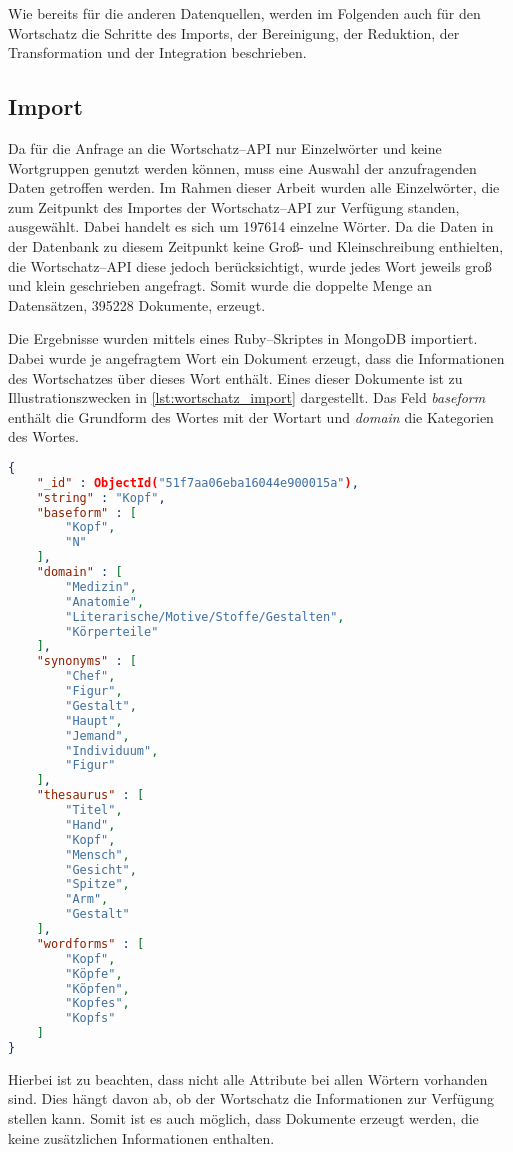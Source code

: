 Wie bereits für die anderen Datenquellen, werden im Folgenden auch für den Wortschatz die Schritte des Imports, der Bereinigung, der Reduktion, der Transformation und der Integration beschrieben.

\subsection{Import}

Da für die Anfrage an die Wortschatz--API nur Einzelwörter und keine Wortgruppen genutzt werden können, muss eine Auswahl der anzufragenden Daten getroffen werden. Im Rahmen dieser Arbeit wurden alle Einzelwörter, die zum Zeitpunkt des Importes der Wortschatz--API zur Verfügung standen, ausgewählt. Dabei handelt es sich um \num{197614} einzelne Wörter. Da die Daten in der Datenbank zu diesem Zeitpunkt keine Groß- und Kleinschreibung enthielten, die Wortschatz--API diese jedoch berücksichtigt, wurde jedes Wort jeweils groß und klein geschrieben angefragt. Somit wurde die doppelte Menge an Datensätzen, \num{395228} Dokumente, erzeugt.

Die Ergebnisse wurden mittels eines Ruby--Skriptes in MongoDB importiert. Dabei wurde je angefragtem Wort ein Dokument erzeugt, dass die Informationen des Wortschatzes über dieses Wort enthält. Eines dieser Dokumente ist zu Illustrationszwecken in \cref{lst:wortschatz_import} dargestellt. Das Feld \emph{baseform} enthält die Grundform des Wortes mit der Wortart und \emph{domain} die Kategorien des Wortes.

\begin{lstlisting}[language=json, label={lst:wortschatz_import}, caption={Wortschatz--Dokument nach dem Import}]
{
    "_id" : ObjectId("51f7aa06eba16044e900015a"),
    "string" : "Kopf",
    "baseform" : [ 
        "Kopf", 
        "N"
    ],
    "domain" : [ 
        "Medizin", 
        "Anatomie", 
        "Literarische/Motive/Stoffe/Gestalten", 
        "Körperteile"
    ],
    "synonyms" : [  
        "Chef", 
        "Figur", 
        "Gestalt", 
        "Haupt", 
        "Jemand", 
        "Individuum", 
        "Figur"
    ],
    "thesaurus" : [ 
        "Titel", 
        "Hand", 
        "Kopf", 
        "Mensch", 
        "Gesicht", 
        "Spitze", 
        "Arm", 
        "Gestalt"
    ],
    "wordforms" : [ 
        "Kopf", 
        "Köpfe", 
        "Köpfen", 
        "Kopfes", 
        "Kopfs"
    ]
}
\end{lstlisting}

Hierbei ist zu beachten, dass nicht alle Attribute bei allen Wörtern vorhanden sind. Dies hängt davon ab, ob der Wortschatz die Informationen zur Verfügung stellen kann. Somit ist es auch möglich, dass Dokumente erzeugt werden, die keine zusätzlichen Informationen enthalten.

